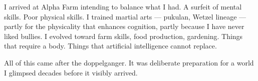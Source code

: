 I arrived at Alpha Farm intending to balance what I had. A surfeit of mental skills. Poor physical skills. I trained martial arts --- pukulan, Wetzel lineage --- partly for the physicality that enhances cognition, partly because I have never liked bullies. I evolved toward farm skills, food production, gardening. Things that require a body. Things that artificial intelligence cannot replace.

All of this came after the doppelganger. It was deliberate preparation for a world I glimpsed decades before it visibly arrived.

\chapterreturn
